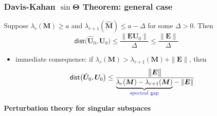 \documentclass[compress,
mathserif,wide,%
]{beamer}
\begin{document}
\begin{frame}
\frametitle{Davis-Kahan $\sin\bm{\Theta}$ Theorem: general case}

\begin{theorem} \label{thm:sin-Theta-general}
	Suppose $\lambda_r(\bm{M})  \geq a$  and $\lambda_{r+1}( \hat{\bm{M}} ) \leq a-\Delta$ for some $\Delta>0$.  Then
%
\[
	\mathsf{dist} \big( \hat{\bm{U}}_{0}, \bm{U}_{0} \big) \leq\frac{\big\|\bm{E}\bm{U}_{0} \big\|}{\Delta} 
\leq \frac{\big\|\bm{E}\big\|}{\Delta}
\]
%
\end{theorem}

\begin{itemize}
	\itemsep0.5em
	\item immediate consequence: if $\lambda_r(\bm{M}) > \lambda_{r+1}({\bm{M}})  + \|\bm{E}\|$, then
%
\begin{equation}
	\label{eq:DK-general-simple}
	\mathsf{dist} \big( \hat{\bm{U}}_{0}, \bm{U}_{0} \big)  
	\leq \frac{\big\|\bm{E}\big\|}{ \underset{\textcolor{blue}{ \text{spectral gap}}}{\underbrace{ \lambda_r(\bm{M}) - \lambda_{r+1}({\bm{M}}) }} - \|\bm{E}\| }
\end{equation}
%

\end{itemize}

\end{frame}


\begin{frame}[plain]

\vfill
\begin{center}
  {\Large\bf Perturbation theory for singular subspaces}
\end{center}
\vfill

\end{frame}
\end{document}
